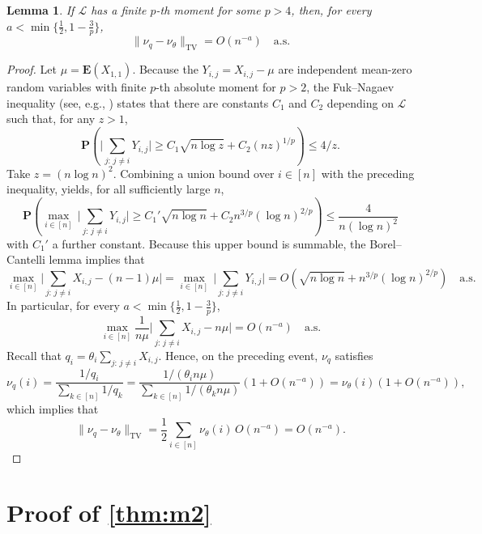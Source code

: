 \documentclass[12pt]{amsart}
\newtheorem{lemma}[theorem]{Lemma}
\renewcommand{\P}{\mathbf{P}}
\newcommand{\E}{\mathbf{E}}
\DeclareMathOperator{\1}{\mathbf{1}}
\begin{document}
\begin{lemma}
	If $\mathcal{L}$ has a finite $p$-th moment for some $p > 4$, then, for every $a < \min\{\tfrac12,1-\tfrac{3}{p}\}$,
	\begin{equation*}%
	\| \nu_q - \nu_\theta \|_{\mathrm{TV}} = O(n^{-a}) \quad \mathrm{a.s.}
	\end{equation*}
\end{lemma}

\begin{proof}
Let $\mu = \E(X_{1,1})$. Because the $Y_{i,j} = X_{i,j} - \mu$ are independent mean-zero random variables with finite $p$-th absolute moment for $p > 2$, the Fuk--Nagaev inequality (see, e.g., \cite[Eq.\ 1.8]{MR3652041}) states that there are constants $C_1$ and $C_2$ depending on $\mathcal{L}$ such that, for any $z > 1$,
\begin{equation*}%
	\P \left( \Big| \sum_{j:\, j \neq i} Y_{i,j} \Big| \geq C_1 \sqrt{n \log z} + C_2 (n z)^{1/p} \right) \leq 4/z.
\end{equation*}
Take $z = (n \log n)^2$. Combining a union bound over $i \in [n]$ with the preceding inequality, yields, for all sufficiently large $n$,
\[
	\P \left( \max_{i \in [n]} \,\Big| \sum_{j:\, j \neq i} Y_{i,j} \Big| \geq C_1' \sqrt{n \log n} + C_2 n^{3/p} (\log n)^{2/p}\right) \leq \frac{4}{n (\log n)^2}
\]
with $C_1'$ a further constant. Because this upper bound is summable, the Borel--Cantelli lemma implies that 
\[
	\max_{i \in [n]} \Big| \sum_{j:\, j \neq i} X_{i,j} - (n-1) \mu \Big| = \max_{i \in [n]} \,\Big| \sum_{j:\, j \neq i} Y_{i,j} \Big| = O \left( \sqrt{n \log n} + n^{3/p}(\log n)^{2/p} \right) \quad \mathrm{a.s.}
\]
In particular, for every $a < \min\{\tfrac12, 1 - \tfrac{3}{p}\}$,
\[
	\max_{i \in [n]} \frac{1}{n\mu} \Big| \sum_{j:\, j \neq i} X_{i,j} - n \mu \Big| = O(n^{-a}) \quad \mathrm{a.s.}
\]
Recall that $q_i = \theta_i \sum_{j:\, j \neq i} X_{i,j}$. Hence, on the preceding event, $\nu_q$ satisfies
\[
	\nu_q (i) = \frac{1/q_i}{\sum_{k \in [n]} 1/q_k} = \frac{1/(\theta_i n \mu)}{\sum_{k \in [n]} 1/(\theta_k n \mu)} \left(1 + O(n^{-a}) \right) = \nu_\theta (i) \left(1 + O(n^{-a}) \right),
\]
which implies that
\[
	\| \nu_q - \nu_\theta \|_{\mathrm{TV}} = \frac12 \sum_{i \in [n]} \nu_\theta (i) \, O(n^{-a}) = O(n^{-a}).
\]
\end{proof}


\section{Proof of \texorpdfstring{\cref{thm:m2}}{Theorem 1.4}}\label{sec: proof of thm2}
\end{document}
